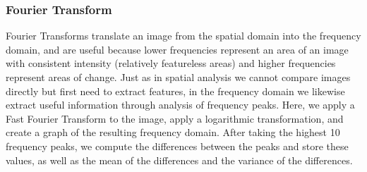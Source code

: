 
\subsubsection{Fourier Transform}

Fourier Transforms translate an image from the spatial domain into the frequency domain, and are useful because lower frequencies represent an area of an image with consistent intensity (relatively featureless areas) and higher frequencies represent areas of change.\cite{Haas_2011}  Just as in spatial analysis we cannot compare images directly but first need to extract features, in the frequency domain we likewise extract useful information through analysis of frequency peaks. Here, we apply a Fast Fourier Transform to the image, apply a logarithmic transformation, and create a graph of the resulting frequency domain. After taking the highest 10 frequency peaks, we compute the differences between the peaks and store these values, as well as the mean of the differences and the variance of the differences. 

    
  
  